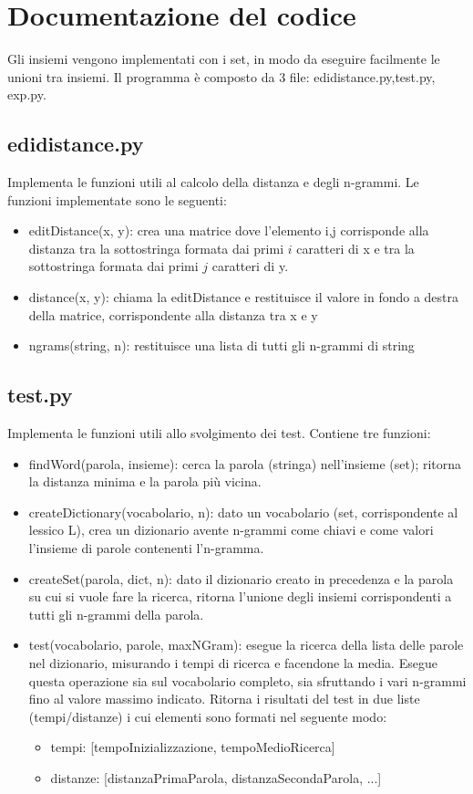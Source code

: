 \documentclass[]{article}
\begin{document}
\section{Documentazione del codice}
Gli insiemi vengono implementati con i set, in modo da eseguire facilmente le unioni tra insiemi.
Il programma è composto da 3 file: edidistance.py,test.py, exp.py.

\subsection*{edidistance.py}
Implementa le funzioni utili al calcolo della distanza e degli n-grammi.
Le funzioni implementate sono le seguenti:
\begin{itemize}
\item editDistance(x, y): crea una matrice dove l'elemento i,j corrisponde alla distanza tra la sottostringa formata dai primi $i$ caratteri di x e tra la sottostringa formata dai primi $j$ caratteri di y.
\item distance(x, y): chiama la editDistance e restituisce il valore in fondo a destra della matrice, corrispondente alla distanza tra x e y
\item ngrams(string, n): restituisce una lista di tutti gli n-grammi di string
\end{itemize}

\subsection*{test.py}
Implementa le funzioni utili allo svolgimento dei test.
Contiene tre funzioni:
\begin{itemize}
\item findWord(parola, insieme): cerca la parola (stringa) nell'insieme (set); ritorna la distanza minima e la parola più vicina.
\item createDictionary(vocabolario, n): dato un vocabolario (set, corrispondente al lessico L), crea un dizionario avente n-grammi come chiavi e come valori l'insieme di parole contenenti l'n-gramma.
\item createSet(parola, dict, n): dato il dizionario creato in precedenza e la parola su cui si vuole fare la ricerca, ritorna l'unione degli insiemi corrispondenti a tutti gli n-grammi della parola.
\item test(vocabolario, parole, maxNGram): esegue la ricerca della lista delle parole nel dizionario, misurando i tempi di ricerca e facendone la media. Esegue questa operazione sia sul vocabolario completo, sia sfruttando i vari n-grammi fino al valore massimo indicato. Ritorna i risultati del test in due liste (tempi/distanze) i cui elementi sono formati nel seguente modo:
\begin{itemize}
\item tempi: [tempoInizializzazione, tempoMedioRicerca]
\item distanze: [distanzaPrimaParola, distanzaSecondaParola, ...]
\end{itemize}
\end{itemize}
\end{document}
